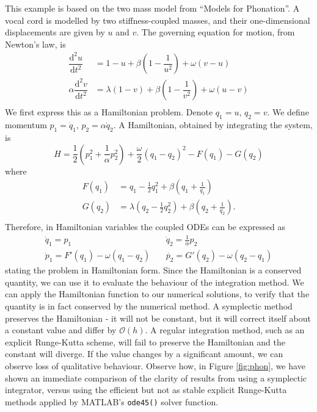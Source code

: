 \documentclass{report}
\theoremstyle{exampstyle} \newtheorem{example}[theorem]{Example}
\theoremstyle{exampstyle} \newtheorem{remark}[theorem]{Remark}
\theoremstyle{exampstyle} \newtheorem{definition}[theorem]{Definition}
\theoremstyle{exampstyle} \newtheorem{lemma}[theorem]{Lemma}
\begin{document}
This example is based on the two mass model from ``Models for Phonation''.
A vocal cord is modelled by two stiffness-coupled masses, and their one-dimensional displacements are given by $u$ and $v$.
The governing equation for motion, from Newton's law, is
\begin{align*}
	\dfrac{\mathrm{d}^2 u}{\mathrm{d}t^2} &= 1 - u + \beta \left(1 - \dfrac{1}{u^2}\right) + \omega (v - u) \\
	\alpha \dfrac{\mathrm{d}^2 v}{\mathrm{d}t^2} &= \lambda(1 - v) + \beta \left(1 - \dfrac{1}{v^2}\right) + \omega (u - v) \\
\end{align*}
We first express this as a Hamiltonian problem. Denote $q_1 = u$, $q_2 = v$.
We define momentum $p_1 = \dot{q}_1$, $p_2 = \alpha \dot{q}_2$.
A Hamiltonian, obtained by integrating the system, is
\begin{equation*}
	H = \frac{1}{2} \left( p_1^2 + \frac{1}{\alpha} p_2^2 \right) + \frac{\omega}{2}(q_1 - q_2)^2 - F(q_1) - G(q_2)
\end{equation*}
where
\begin{align*}
	F(q_1) &= q_1 - \frac{1}{2}q_1^2 + \beta \left( q_1 + \frac{1}{q_1} \right) \\
	G(q_2) &= \lambda \left(q_2 - \frac{1}{2}q_2^2 \right) + \beta \left( q_2 + \frac{1}{q_2} \right). \\
\end{align*}
Therefore, in Hamiltonian variables the coupled ODEs can be expressed as
\begin{eqnarray*}
	\dot{q}_1 = p_1 & ~ & \dot{q}_2 = \frac{1}{\alpha} p_2 \\
	\dot{p}_1 = F'(q_1) - \omega(q_1 - q_2) & ~ & \dot{p_2} = G'(q_2) - \omega(q_2 - q_1)
\end{eqnarray*}
stating the problem in Hamiltonian form.
Since the Hamiltonian is a conserved quantity, we can use it to evaluate the behaviour of the integration method.
We can apply the Hamiltonian function to our numerical solutions, to verify that the quantity is in fact conserved by the numerical method.
A symplectic method preserves the Hamiltonian - it will not be constant, but it will correct itself about a constant value and differ by $\mathcal{O}(h)$.
A regular integration method, such as an explicit Runge-Kutta scheme, will fail to preserve the Hamiltonian and the constant will diverge.
If the value changes by a significant amount, we can observe loss of qualitative behaviour.
Observe how, in Figure \ref{fig:phon}, we have shown an immediate comparison of the clarity of results from using a symplectic integrator,
versus using the efficient but not as stable explicit Runge-Kutta methods applied by MATLAB's \texttt{ode45()} solver function.
\end{document}
